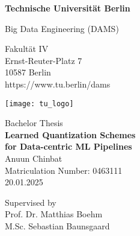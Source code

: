 \thispagestyle{empty}
\begin{center}

\vspace*{1.4cm}
{\LARGE \textbf{Technische Universität Berlin}}

\vspace{0.5cm}

{\large Big Data Engineering (DAMS)\\[1mm]}

Fakultät IV\\
Ernst-Reuter-Platz 7\\
10587 Berlin\\
https://www.tu.berlin/dams\\

\vspace*{1cm}

\texttt{[image: tu\_logo]}

\vspace*{1.0cm}

{\LARGE Bachelor Thesis}\\ %

\vspace{1.0cm}
{\LARGE \textbf{Learned Quantization Schemes}}\\
\vspace*{0.3cm}
{\LARGE \textbf{for Data-centric ML Pipelines}}\\
\vspace*{1.0cm}
{\LARGE Anuun Chinbat}
\\
\vspace*{0.5cm}
Matriculation Number: 0463111\\
20.01.2025\\ %
\vspace*{1.0cm}

Supervised by\\
Prof. Dr. Matthias Boehm \\
M.Sc. Sebastian Baunsgaard



\end{center}

